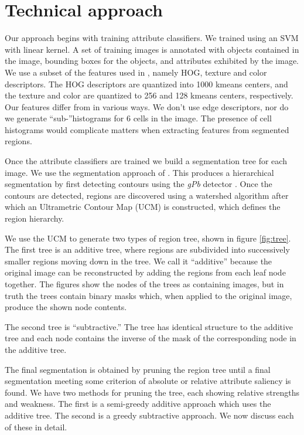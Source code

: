 \documentclass[10pt,twocolumn,letterpaper]{article}
\begin{document}
\section{Technical approach}
\label{sec:technical}
Our approach begins with training attribute classifiers.  We trained using
an SVM with linear kernel.  A set of training images is annotated with objects
contained in the image, bounding boxes for the objects, and attributes exhibited
by the image.  We use a subset of the features used in \cite{farhadi09}, namely
HOG, texture and color descriptors.  The HOG descriptors are quantized into 1000
kmeans centers, and the texture and color are quantized to 256 and 128 kmeans centers,
respectively.  Our features differ from \cite{farhadi09} in various ways.  We don't
use edge descriptors, nor do we generate ``sub-''histograms for 6 cells in the
image.  The presence of cell histograms would complicate matters when extracting
features from segmented regions.

Once the attribute classifiers are trained we build a segmentation tree for each
image.  We use the segmentation
approach of \cite{arbelaez09}.  This produces a hierarchical
segmentation by first detecting contours using the \emph{gPb} detector
\cite{maire08}.  Once the contours are detected, regions are discovered using a
watershed algorithm after which an Ultrametric Contour Map (UCM) is constructed,
which defines the region hierarchy.

We use the UCM to generate two types of region tree, shown in figure \ref{fig:tree}.
The first tree is an additive tree, where regions are subdivided into successively
smaller regions moving down in the tree.  We call it ``additive'' because the
original image can be reconstructed by adding the regions from each leaf node
together.  The figures show the nodes of the trees as containing images, but in
truth the trees contain binary masks which, when applied to the original image,
produce the shown node contents.

The second tree is ``subtractive.''  The tree has identical structure to the additive
tree and each node contains the inverse of the mask of the corresponding node
in the additive tree.

The final segmentation is obtained by pruning the region tree until a final segmentation
meeting some criterion of absolute or relative attribute saliency is found.
We have two methods for pruning the tree, each showing relative strengths and
weakness.  The first is a semi-greedy additive approach which uses the additive
tree.  The second is a greedy subtractive approach.  We now discuss each of these 
in detail.
\end{document}
